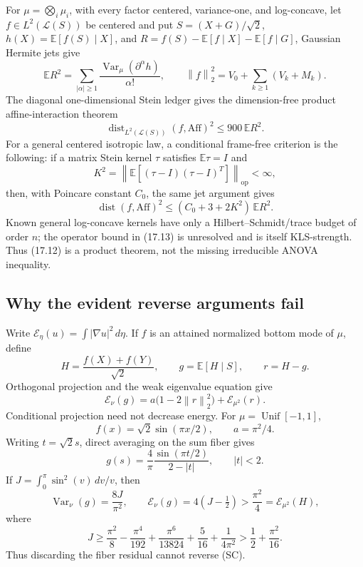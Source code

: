 \documentclass[11pt]{article}
\theoremstyle{definition}
\theoremstyle{remark}
\newcommand{\E}{\mathbb E}
\newcommand{\Var}{\operatorname{Var}}
\newcommand{\op}{\mathrm{op}}
\newcommand{\1}{\mathbf 1}
\newcommand{\norm}[1]{\left\lVert #1\right\rVert}
\begin{document}
For \(\mu=\bigotimes_i\mu_i\), with every factor centered,
variance-one, and log-concave, let \(f\in L^2(\mathcal L(S))\) be
centered and put \(S=(X+G)/\sqrt2\), \(h(X)=\E[f(S)\mid X]\), and
\(R=f(S)-\E[f\mid X]-\E[f\mid G]\), Gaussian Hermite jets give
\[
 \E R^2=\sum_{|\alpha|\ge1}\frac{\Var_\mu(\partial^\alpha h)}{\alpha!},
 \qquad
 \norm{f}_2^2=V_0+\sum_{k\ge1}(V_k+M_k).
\]
The diagonal one-dimensional Stein ledger gives the dimension-free product
affine-interaction theorem
\[
 \operatorname{dist}_{L^2(\mathcal L(S))}(f,\mathrm{Aff})^2\le900\,\E R^2. \tag{17.12}
\]
For a general centered isotropic law, a conditional frame-free criterion is
the following: if a matrix Stein kernel \(\tau\) satisfies \(\E\tau=I\) and
\[
 K^2=\norm{\E[(\tau-I)(\tau-I)^T]}_{\op}<\infty,
\]
then, with Poincare constant \(C_0\), the same jet argument gives
\[
 \operatorname{dist}(f,\mathrm{Aff})^2\le(C_0+3+2K^2)\,\E R^2.             \tag{17.13}
\]
Known general log-concave kernels have only a Hilbert--Schmidt/trace budget
of order \(n\); the operator bound in (17.13) is unresolved and is itself
KLS-strength.  Thus (17.12) is a product theorem, not the missing
irreducible ANOVA inequality.

\subsection{Why the evident reverse arguments fail}

Write \(\mathcal E_\eta(u)=\int|\nabla u|^2\,d\eta\).  If \(f\) is an
attained normalized bottom mode of \(\mu\), define
\[
 H=\frac{f(X)+f(Y)}{\sqrt2},\qquad
 g=\E[H\mid S],\qquad r=H-g.
\]
Orthogonal projection and the weak eigenvalue equation give
\[
 \boxed{\qquad
 \mathcal E_\nu(g)
 =a\bigl(1-2\norm r_2^2\bigr)+\mathcal E_{\mu^2}(r).
 \qquad}                                              \tag{10.4}
\]
Conditional projection need not decrease energy.  For
\(\mu=\operatorname{Unif}[-1,1]\),
\[
 f(x)=\sqrt2\sin(\pi x/2),\qquad a=\pi^2/4.
\]
Writing \(t=\sqrt2s\), direct averaging on the sum fiber gives
\[
 g(s)=\frac4\pi\frac{\sin(\pi t/2)}{2-|t|},\qquad |t|<2.
\]
If \(J=\int_0^\pi\sin^2(v)\,dv/v\), then
\[
 \Var_\nu(g)=\frac{8J}{\pi^2},\qquad
 \mathcal E_\nu(g)=4(J-\tfrac12)>\frac{\pi^2}{4}
                  =\mathcal E_{\mu^2}(H),            \tag{10.5}
\]
where
\[
 J\ge\frac{\pi^2}{8}-\frac{\pi^4}{192}
 +\frac{\pi^6}{13824}+\frac5{16}+\frac1{4\pi^2}
 >\frac12+\frac{\pi^2}{16}.                          \tag{10.6}
\]
Thus discarding the fiber residual cannot reverse (SC).
\end{document}
